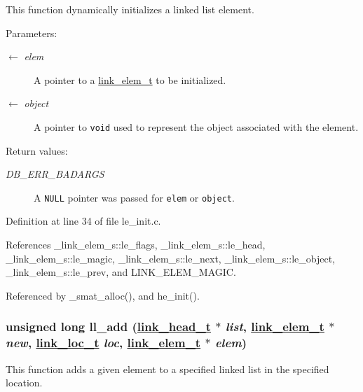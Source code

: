 This function dynamically initializes a linked list element.

\begin{Desc}
\item[Parameters:]
\begin{description}
\item[\mbox{$\leftarrow$} {\em elem}]A pointer to a \hyperlink{group__dbprim__link_ga1}{link\_\-elem\_\-t} to be initialized. \item[\mbox{$\leftarrow$} {\em object}]A pointer to {\tt void} used to represent the object associated with the element.\end{description}
\end{Desc}
\begin{Desc}
\item[Return values:]
\begin{description}
\item[{\em DB\_\-ERR\_\-BADARGS}]A {\tt NULL} pointer was passed for {\tt elem} or {\tt object}.\end{description}
\end{Desc}


Definition at line 34 of file le\_\-init.c.

References \_\-link\_\-elem\_\-s::le\_\-flags, \_\-link\_\-elem\_\-s::le\_\-head, \_\-link\_\-elem\_\-s::le\_\-magic, \_\-link\_\-elem\_\-s::le\_\-next, \_\-link\_\-elem\_\-s::le\_\-object, \_\-link\_\-elem\_\-s::le\_\-prev, and LINK\_\-ELEM\_\-MAGIC.

Referenced by \_\-smat\_\-alloc(), and he\_\-init().\hypertarget{group__dbprim__link_ga6}{
\subsubsection[ll\_\-add]{\setlength{\rightskip}{0pt plus 5cm}unsigned long ll\_\-add (\hyperlink{struct__link__head__s}{link\_\-head\_\-t} $\ast$ {\em list}, \hyperlink{struct__link__elem__s}{link\_\-elem\_\-t} $\ast$ {\em new}, \hyperlink{group__dbprim__link_ga4}{link\_\-loc\_\-t} {\em loc}, \hyperlink{struct__link__elem__s}{link\_\-elem\_\-t} $\ast$ {\em elem})}}
\label{group__dbprim__link_ga6}


This function adds a given element to a specified linked list in the specified location.

